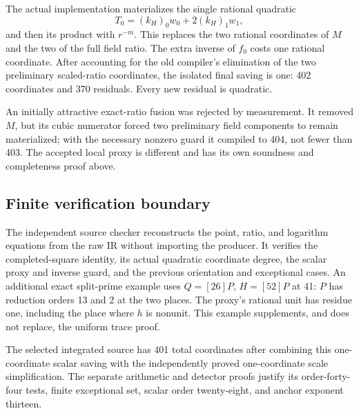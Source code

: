 The actual implementation materializes the single rational quadratic
\[
 T_0=(k_H)_0w_0+2(k_H)_1w_1,
\]
and then its product with $r^{-m}$. This replaces the two rational
coordinates of $M$ and the two of the full field ratio. The extra
inverse of $f_0$ costs one rational coordinate. After accounting for
the old compiler's elimination of the two preliminary scaled-ratio
coordinates, the isolated final saving is one: 402 coordinates and
370 residuals. Every new residual is quadratic.

An initially attractive exact-ratio fusion was rejected by measurement.
It removed $M$, but its cubic numerator forced two preliminary field
components to remain materialized; with the necessary nonzero guard
it compiled to 404, not fewer than 403. The accepted local proxy is
different and has its own soundness and completeness proof above.

\subsection{Finite verification boundary}

The independent source checker reconstructs the point, ratio, and
logarithm equations from the raw IR without importing the producer.
It verifies the completed-square identity, its actual quadratic
coordinate degree, the scalar proxy and inverse guard, and the previous
orientation and exceptional cases. An additional exact split-prime
example uses $Q=[26]P$, $H=[52]P$ at 41: $P$ has reduction orders
13 and 2 at the two places. The proxy's rational unit has residue one,
including the place where $h$ is nonunit. This example supplements,
and does not replace, the uniform trace proof.

The selected integrated source has 401 total coordinates after combining
this one-coordinate scalar saving with the independently proved
one-coordinate scale simplification. The separate arithmetic and detector
proofs justify its order-forty-four tests, finite exceptional set, scalar
order twenty-eight, and anchor exponent thirteen.
